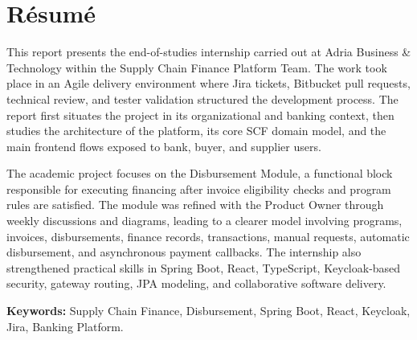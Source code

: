 \chapter*{R\'esum\'e}

This report presents the end-of-studies internship carried out at Adria Business \& Technology within the Supply Chain Finance Platform Team. The work took place in an Agile delivery environment where Jira tickets, Bitbucket pull requests, technical review, and tester validation structured the development process. The report first situates the project in its organizational and banking context, then studies the architecture of the platform, its core SCF domain model, and the main frontend flows exposed to bank, buyer, and supplier users.

The academic project focuses on the Disbursement Module, a functional block responsible for executing financing after invoice eligibility checks and program rules are satisfied. The module was refined with the Product Owner through weekly discussions and diagrams, leading to a clearer model involving programs, invoices, disbursements, finance records, transactions, manual requests, automatic disbursement, and asynchronous payment callbacks. The internship also strengthened practical skills in Spring Boot, React, TypeScript, Keycloak-based security, gateway routing, JPA modeling, and collaborative software delivery.

\textbf{Keywords:} Supply Chain Finance, Disbursement, Spring Boot, React, Keycloak, Jira, Banking Platform.
